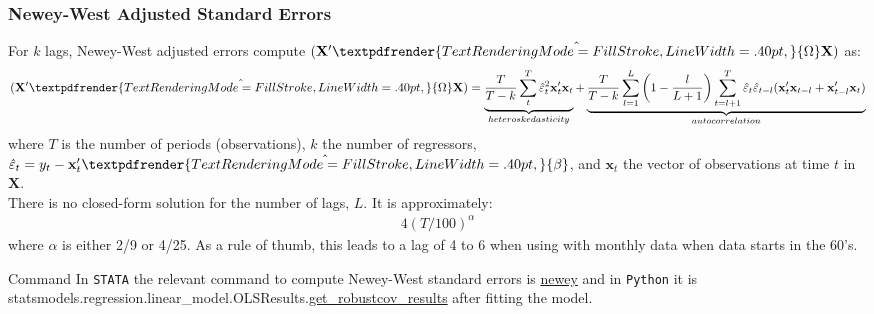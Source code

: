 \documentclass[xcolor=dvipsnames, english, 8pt]{beamer}
\newcommand*{\boldgreek}[1]{%
  \textpdfrender{%
    TextRenderingMode=FillStroke,%
    LineWidth=.40pt,%
  }{#1}%
}
\begin{document}
\begin{frame}
    \frametitle{Newey-West Adjusted Standard Errors}
For $k$ lags, Newey-West adjusted errors compute $(\mathbf{X}'\hat{\boldgreek{\Omega}}\mathbf{X})$ as:
\begin{align}
	(\mathbf{X}'\hat{\boldgreek{\Omega}}\mathbf{X}) = \underbrace{\frac{T}{T-k}\sum\limits_t^{T} \hat{\varepsilon}_t^2\mathbf{x}_t'\mathbf{x}_t}_{heteroskedasticity} + \underbrace{\frac{T}{T-k}\sum\limits_{l=1}^{L}\left(1-\frac{l}{L+1}\right)\sum\limits_{t=l+1}^T \hat{\varepsilon}_t \hat{\varepsilon}_{t-l}(\mathbf{x}_t'\mathbf{x}_{t-l} + \mathbf{x}_{t-l}'\mathbf{x}_t)}_{autocorrelation}
\end{align}
where $T$ is the number of periods (observations), $k$ the number of regressors, $\hat{\varepsilon}_t = y_t - \mathbf{x}_t'\hat{\boldgreek{\beta}}$, and $\mathbf{x}_t$ the vector of observations at time $t$ in $\mathbf{X}$.\vspace{0.5cm}\\

There is no closed-form solution for the number of lags, $L$. It is approximately:
\begin{align*}
	4(T/100)^{\alpha}
\end{align*}
where $\alpha$ is either 2/9 or 4/25. As a rule of thumb, this leads to a lag of 4 to 6 when using with monthly data when data starts in the 60's.
 \vfill
    \begin{exampleblock}{{\small{Command}}}
    In  \texttt{STATA} the relevant command to compute Newey-West standard errors is \href{https://www.stata.com/manuals13/tsnewey.pdf}{\color{Purple}newey} and in \texttt{Python} it is statsmodels.regression.linear\_model.OLSResults.\href{https://www.statsmodels.org/dev/generated/statsmodels.regression.linear_model.OLSResults.get_robustcov_results.html}{\color{Purple}get\_robustcov\_results} after fitting the model.
    \end{exampleblock}

\end{frame}
\end{document}
